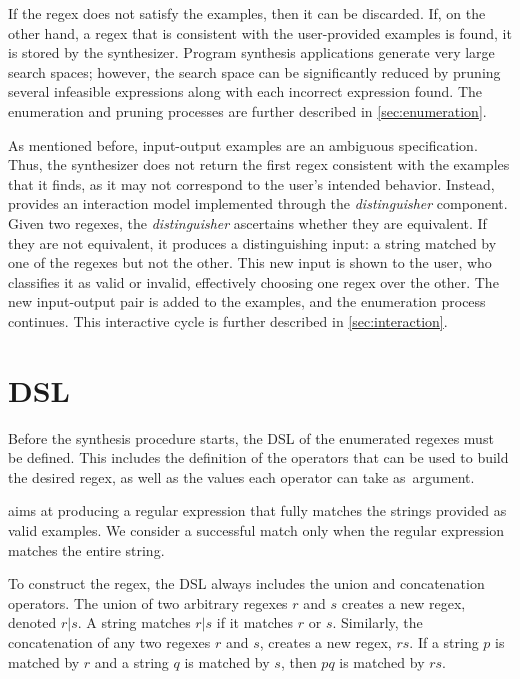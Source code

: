 If the regex does not satisfy the examples, then it can be discarded. If, on the other hand, a regex that is consistent with the user-provided examples is found, it is stored by the synthesizer.
Program synthesis applications generate very large search spaces; however, the search space can be significantly reduced by pruning several infeasible expressions along with each incorrect expression found. 
The enumeration and pruning processes are further described in \autoref{sec:enumeration}.

As mentioned before, input-output examples are an ambiguous specification. Thus, the synthesizer does not return the first regex consistent with the examples that it finds, as it may not correspond to the user's intended behavior. Instead, \Forest{} provides an interaction model implemented through the \textit{distinguisher} component. Given two regexes, the \textit{distinguisher} ascertains whether they are equivalent. If they are not equivalent, it produces a distinguishing input: a string matched by one of the regexes but not the other. This new input is shown to the user, who classifies it as valid or invalid, effectively choosing one regex over the other. The new input-output pair is added to the examples, and the enumeration process continues. This interactive cycle is further described in \autoref{sec:interaction}. 


\section{\acf{DSL}}\label{sec:dsl}
Before the synthesis procedure starts, the \ac{DSL} of the enumerated regexes must be defined. This includes the definition of the operators that can be used to build the desired regex, as well as the values each operator can take as~argument. 

\Forest{} aims at producing a regular expression that fully  matches the strings provided as valid examples. We consider a successful match only when the regular expression matches the entire string.%

To construct the regex, the \ac{DSL} always includes the union %
and concatenation operators. The union of two arbitrary regexes \(r\) and \(s\) creates a new regex, denoted \(r|s\). A string matches \(r|s\) if it matches \(r\) or \(s\). Similarly, the concatenation of any two regexes \(r\) and \(s\), creates a new regex, \(rs\). If a string \(p\) is matched by \(r\) and a string \(q\) is matched by \(s\), then \(pq\) is matched by \(rs\).

